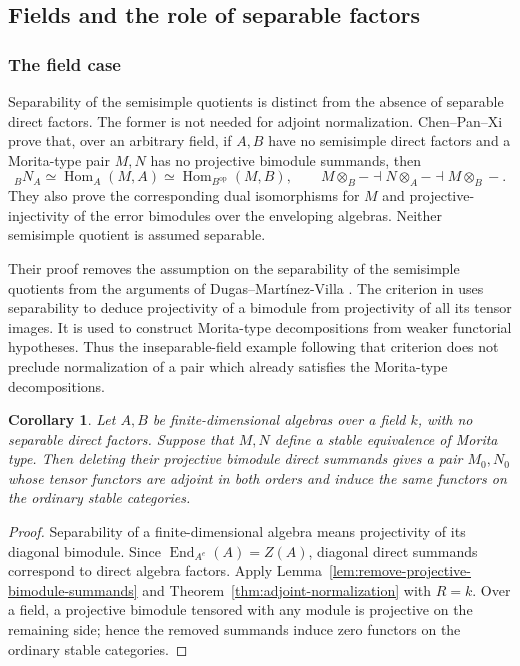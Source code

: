 \documentclass[12pt,a4paper,english,reqno]{amsart}
\numberwithin{equation}{section}
\theoremstyle{plain}
\newtheorem{corollary}[theorem]{Corollary}
\theoremstyle{definition}
\begin{document}
\subsection{Fields and the role of separable factors}
\label{sec:adjoint-field}

\subsubsection{The field case}

Separability of the semisimple quotients is distinct from the absence
of separable direct factors.  The former is not needed for adjoint
normalization.  Chen--Pan--Xi
\cite[Lemma~4.1, p.~650]{CPX2012} prove that, over an arbitrary field,
if $A,B$ have no semisimple direct factors and a
Morita-type pair $M,N$ has no projective bimodule summands, then
\[
 {}_BN_A\simeq\operatorname{Hom}_A(M,A)
       \simeq\operatorname{Hom}_{B^{\mathrm{op}}}(M,B),
 \qquad
 M\otimes_B-\dashv N\otimes_A-\dashv M\otimes_B-.
\]
They also prove the corresponding dual isomorphisms for $M$ and
projective-injectivity of the error bimodules over the enveloping
algebras.  Neither semisimple quotient is assumed separable.

Their proof removes the assumption on the separability of the
semisimple quotients from the arguments of Dugas--Mart\'inez-Villa
\cite[Theorem~2.7 and Corollary~3.1]{DMV2007}.
The criterion in \cite[Theorem~2.8]{DMV2007} uses separability to
deduce projectivity of a bimodule from projectivity of all its tensor
images.  It is used to construct Morita-type decompositions from
weaker functorial hypotheses.  Thus the inseparable-field example
following that criterion does not preclude normalization of a pair
which already satisfies the Morita-type decompositions.

\begin{corollary}
\label{thm:adjoint-arbitrary-field}
Let $A,B$ be finite-dimensional algebras over a field $k$, with
no separable direct factors.  Suppose that $M,N$ define a stable
equivalence of Morita type.  Then deleting their projective bimodule
direct summands gives a pair $M_0,N_0$ whose tensor functors are
adjoint in both orders and induce
the same functors on the ordinary stable categories.
\end{corollary}

\begin{proof}
Separability of a finite-dimensional algebra means projectivity
of its diagonal bimodule.  Since
$\operatorname{End}_{A^e}(A)=Z(A)$, diagonal direct summands
correspond to direct algebra factors.  Apply
Lemma~\ref{lem:remove-projective-bimodule-summands} and
Theorem~\ref{thm:adjoint-normalization} with $R=k$.
Over a field, a projective bimodule tensored with any module
is projective on the remaining side; hence the removed summands
induce zero functors on the ordinary stable categories.
\end{proof}
\end{document}
